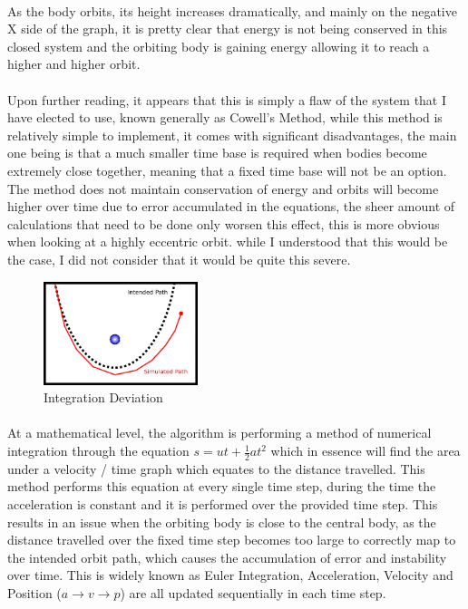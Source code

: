 \paragraph{}
As the body orbits, its height increases dramatically, and mainly on the negative X side of the graph, it is pretty clear that energy is not being conserved in this closed system and the orbiting body is gaining energy allowing it to reach a higher and higher orbit.

\paragraph{}
Upon further reading, it appears that this is simply a flaw of the system that I have elected to use, known generally as Cowell's Method, while this method is relatively simple to implement, it comes with significant disadvantages, the main one being is that a much smaller time base is required when bodies become extremely close together, meaning that a fixed time base will not be an option. The method does not maintain conservation of energy and orbits will become higher over time due to error accumulated in the equations, the sheer amount of calculations that need to be done only worsen this effect, this is more obvious when looking at a highly eccentric orbit. while I understood that this would be the case, I did not consider that it would be quite this severe.

\begin{figure}
  \centering
  \includegraphics[width=0.4\textwidth]{img/orbitbad.png}
  \caption{Integration Deviation}
  \vspace{-10pt}
\end{figure}

\paragraph{}
At a mathematical level, the algorithm is performing a method of numerical integration through the equation $s=ut+\frac{1}{2}at^2$ which in essence will find the area under a velocity / time graph which equates to the distance travelled. This method performs this equation at every single time step, during the time the acceleration is constant and it is performed over the provided time step. This results in an issue when the orbiting body is close to the central body, as the distance travelled over the fixed time step becomes too large to correctly map to the intended orbit path, which causes the accumulation of error and instability over time. This is widely known as Euler Integration, Acceleration, Velocity and Position ($a \rightarrow v \rightarrow p$) are all updated sequentially in each time step.

